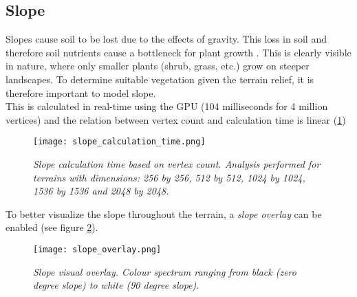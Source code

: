 \subsection{Slope}

Slopes cause soil to be lost due to the effects of gravity. This loss in soil and therefore soil nutrients cause a bottleneck for plant growth \cite{Kapolka2001}
. This is clearly visible in nature, where only smaller plants (shrub, grass, etc.) grow on steeper landscapes. To determine suitable vegetation given the terrain relief, it is therefore important to model slope.\\

This is calculated in real-time using the GPU (104 milliseconds for 4 million vertices) and the relation between vertex count and calculation time is linear (\ref{fig:slope_calculation_time})

\begin{figure}
\center
	\texttt{[image: slope\_calculation\_time.png]}
	\caption{ \textit{Slope calculation time based on vertex count. Analysis performed for terrains with dimensions: 256 by 256, 512 by 512, 1024 by 1024, 1536 by 1536 and 2048 by 2048.}  }
	\label{fig:slope_calculation_time}
\end{figure}

To better visualize the slope throughout the terrain, a \textit{slope overlay} can be enabled (see figure \ref{fig:slope overlay}).

\begin{figure}
\center
	\texttt{[image: slope\_overlay.png]}
	\caption{ \textit{Slope visual overlay. Colour spectrum ranging from black (zero degree slope) to white (90 degree slope).} }
	\label{fig:slope overlay}
\end{figure}